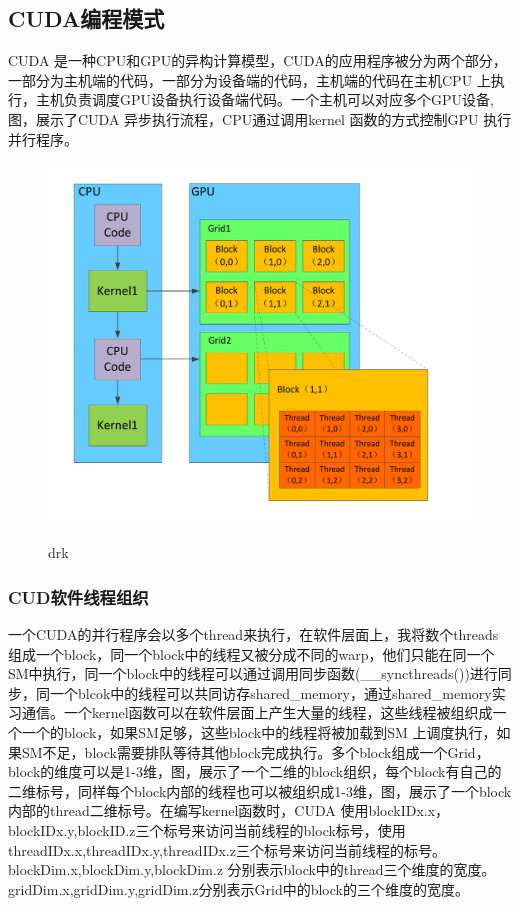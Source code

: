 \subsection{CUDA编程模式}
CUDA 是一种CPU和GPU的异构计算模型，CUDA的应用程序被分为两个部分，一部分为主机端的代码，一部分为设备端的代码，主机端的代码在主机CPU 上执行，主机负责调度GPU设备执行设备端代码。一个主机可以对应多个GPU设备,图，展示了CUDA 异步执行流程，CPU通过调用kernel 函数的方式控制GPU 执行并行程序。\newline
\begin{figure}
\setlength{\belowcaptionskip}{-0.5cm}
  \begin{center}
    {\includegraphics[width=1 \textwidth]{figures/block.pdf}}
    \end{center}
  \caption{{\footnotesize{drk}}}
  \label{drk}
\end{figure}
\subsubsection{CUD软件线程组织}
一个CUDA的并行程序会以多个thread来执行，在软件层面上，我将数个threads组成一个block，同一个block中的线程又被分成不同的warp，他们只能在同一个SM中执行，同一个block中的线程可以通过调用同步函数(\_\_syncthreads())进行同步，同一个blcok中的线程可以共同访存shared\_memory，通过shared\_memory实习通信。一个kernel函数可以在软件层面上产生大量的线程，这些线程被组织成一个一个的block，如果SM足够，这些block中的线程将被加载到SM 上调度执行，如果SM不足，block需要排队等待其他block完成执行。多个block组成一个Grid，block的维度可以是1-3维，图，展示了一个二维的block组织，每个block有自己的二维标号，同样每个block内部的线程也可以被组织成1-3维，图，展示了一个block内部的thread二维标号。在编写kernel函数时，CUDA 使用blockIDx.x，blockIDx.y,blockID.z三个标号来访问当前线程的block标号，使用threadIDx.x,threadIDx.y,threadIDx.z三个标号来访问当前线程的标号。blockDim.x,blockDim.y,blockDim.z 分别表示block中的thread三个维度的宽度。gridDim.x,gridDim.y,gridDim.z分别表示Grid中的block的三个维度的宽度。\newline
